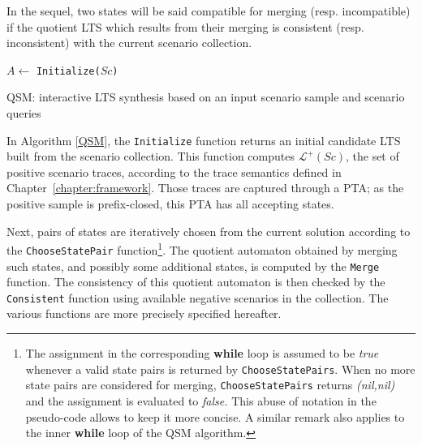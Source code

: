 In the sequel, two states will be said compatible for merging (resp. incompatible) if the quotient LTS which results from their merging is consistent (resp. inconsistent) with the current scenario collection.

\begin{algorithm}
{
$A \leftarrow $ {\tt Initialize($Sc$)}\\
}
\vspace{0.2cm}
\caption{\textsc{QSM}: interactive LTS synthesis based on an input scenario sample and scenario queries\label{QSM}}
\end{algorithm}

In Algorithm \ref{QSM}, the \texttt{Initialize} function returns an initial candidate LTS built from the scenario collection. This function computes $\mathcal{L}^+(Sc)$, the set of positive scenario traces, according to the trace semantics defined in Chapter~\ref{chapter:framework}. Those traces are captured through a PTA; as the positive sample is prefix-closed, this PTA has all accepting states.

Next, pairs of states are iteratively chosen from the current solution according to the \texttt{ChooseStatePair} function\footnote{The assignment in the corresponding \textbf{while} loop is assumed to be \textit{true} whenever a valid state pairs is returned by \texttt{ChooseStatePairs}. When no more state pairs are considered for merging, \texttt{ChooseStatePairs} returns \textit{(nil,nil)} and the assignment is evaluated to \textit{false.} This abuse of notation in the pseudo-code allows to keep it more concise. A similar remark also applies to the inner \textbf{while} loop of the \textsc{QSM} algorithm.}. The quotient automaton obtained by merging such states, and possibly some additional states, is computed by the \texttt{Merge} function. The consistency of this quotient automaton is then checked by the \texttt{Consistent} function using available negative scenarios in the collection. The various functions are more precisely specified hereafter.

